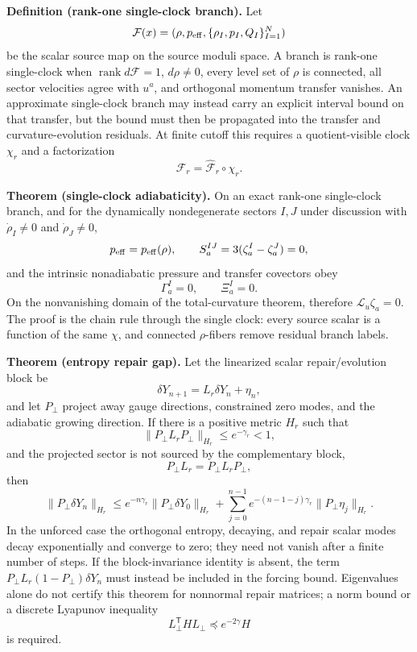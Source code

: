 \textbf{Definition (rank-one single-clock branch).}\label{def:oph-single-clock}
Let
\[
\mathcal F(x)=
(\rho,p_{\rm eff},\{\rho_I,p_I,Q_I\}_{I=1}^N)
\]
be the scalar source map on the source moduli space.  A branch is rank-one
single-clock when \(\operatorname{rank}d\mathcal F=1\), \(d\rho\ne0\), every
level set of \(\rho\) is connected, all sector velocities agree with \(u^a\),
and orthogonal momentum transfer vanishes. An approximate single-clock branch
may instead carry an explicit interval bound on that transfer, but the bound
must then be propagated into the transfer and curvature-evolution residuals.
At finite cutoff this requires a quotient-visible clock \(\chi_r\) and a factorization
\[
\mathcal F_r=\widehat{\mathcal F}_r\circ\chi_r .
\]

\textbf{Theorem (single-clock adiabaticity).}\label{thm:oph-single-clock-adiabaticity}
On an exact rank-one single-clock branch, and for the dynamically
nondegenerate sectors \(I,J\) under discussion with
\(\dot\rho_I\ne0\) and \(\dot\rho_J\ne0\),
\[
p_{\rm eff}=p_{\rm eff}(\rho),\qquad
S_a^{IJ}=3(\zeta_a^I-\zeta_a^J)=0,
\]
and the intrinsic nonadiabatic pressure and transfer covectors obey
\[
\Gamma_a^I=0,\qquad \Xi_a^I=0 .
\]
On the nonvanishing domain of the total-curvature theorem, therefore
\(\mathcal L_u\zeta_a=0\). The proof is the chain rule through the
single clock: every source scalar is a function of the same \(\chi\), and
connected \(\rho\)-fibers remove residual branch labels.

\textbf{Theorem (entropy repair gap).}\label{thm:oph-entropy-repair-gap}
Let the linearized scalar repair/evolution block be
\[
\delta Y_{n+1}=L_r\delta Y_n+\eta_n,
\]
and let \(P_\perp\) project away gauge directions, constrained zero modes, and
the adiabatic growing direction.  If there is a positive metric \(H_r\) such
that
\[
\|P_\perp L_rP_\perp\|_{H_r}\le e^{-\gamma_r}<1,
\]
and the projected sector is not sourced by the complementary block,
\[
P_\perp L_r=P_\perp L_rP_\perp,
\]
then
\[
\|P_\perp\delta Y_n\|_{H_r}
\le
e^{-n\gamma_r}\|P_\perp\delta Y_0\|_{H_r}
+
\sum_{j=0}^{n-1}e^{-(n-1-j)\gamma_r}\|P_\perp\eta_j\|_{H_r}.
\]
In the unforced case the orthogonal entropy, decaying, and repair scalar
modes decay exponentially and converge to zero; they need not vanish after a
finite number of steps. If the block-invariance identity is absent, the term
\(P_\perp L_r(1-P_\perp)\delta Y_n\) must instead be included in the forcing
bound. Eigenvalues alone do not certify this theorem for nonnormal
repair matrices; a norm bound or a discrete Lyapunov inequality
\[
L_\perp^{\mathsf T}H L_\perp\preceq e^{-2\gamma}H
\]
is required.

